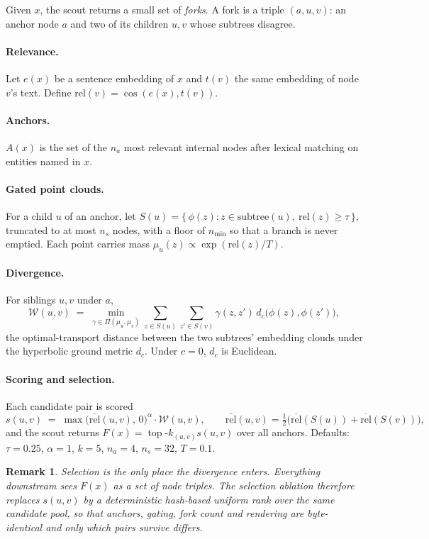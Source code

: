 \documentclass[11pt]{article}
\newcommand{\Wass}{\mathcal{W}}
\newcommand{\rel}{\mathrm{rel}}
\newcommand{\topk}{\operatorname{top}\text{-}k}
\newtheorem{remark}{Remark}
\begin{document}
Given $x$, the scout returns a small set of \emph{forks}. A fork is a triple
$(a, u, v)$: an anchor node $a$ and two of its children $u, v$ whose subtrees
disagree.

\paragraph{Relevance.} Let $e(x)$ be a sentence embedding of $x$ and $t(v)$ the
same embedding of node $v$'s text. Define $\rel(v) = \cos(e(x), t(v))$.

\paragraph{Anchors.} $A(x)$ is the set of the $n_a$ most relevant internal nodes
after lexical matching on entities named in $x$.

\paragraph{Gated point clouds.} For a child $u$ of an anchor, let
$S(u) = \{\, \phi(z) : z \in \mathrm{subtree}(u),\ \rel(z) \ge \tau \,\}$,
truncated to at most $n_s$ nodes, with a floor of $n_{\min}$ so that a branch
is never emptied. Each point carries mass
$\mu_u(z) \propto \exp(\rel(z)/T)$.

\paragraph{Divergence.} For siblings $u, v$ under $a$,
\[
  \Wass(u, v) \;=\; \min_{\gamma \in \Pi(\mu_u, \mu_v)}
  \sum_{z \in S(u)} \sum_{z' \in S(v)} \gamma(z, z')\, d_c\!\big(\phi(z), \phi(z')\big),
\]
the optimal-transport distance between the two subtrees' embedding clouds under
the hyperbolic ground metric $d_c$. Under $c=0$, $d_c$ is Euclidean.

\paragraph{Scoring and selection.} Each candidate pair is scored
\[
  s(u, v) \;=\; \max\!\big(\bar{\rel}(u,v),\, 0\big)^{\alpha} \cdot \Wass(u, v),
  \qquad
  \bar{\rel}(u,v) = \tfrac12\big(\overline{\rel}(S(u)) + \overline{\rel}(S(v))\big),
\]
and the scout returns $F(x) = \topk_{(u,v)} s(u,v)$ over all anchors. Defaults:
$\tau = 0.25$, $\alpha = 1$, $k = 5$, $n_a = 4$, $n_s = 32$, $T = 0.1$.

\begin{remark}
Selection is the only place the divergence enters. Everything downstream sees
$F(x)$ as a set of node triples. The selection ablation therefore replaces
$s(u,v)$ by a deterministic hash-based uniform rank over the \emph{same}
candidate pool, so that anchors, gating, fork count and rendering are byte-
identical and only which pairs survive differs.
\end{remark}
\end{document}
